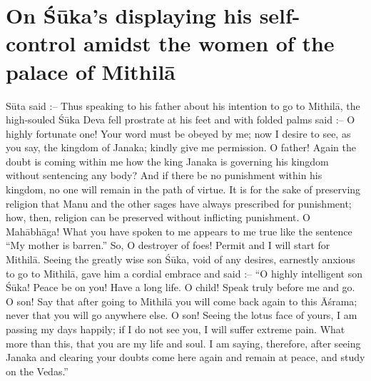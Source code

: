 \chapter{On \'S\=uka's displaying his self-control amidst the women of the palace of Mithil\=a}

S\=uta said :-- Thus speaking to his father about his intention to go to Mithil\=a, the high-souled \'S\=uka Deva fell prostrate at his feet and with folded palms said :-- O highly fortunate one! Your word must be obeyed by me; now I desire to see, as you say, the kingdom of Janaka; kindly give me permission. O father! Again the doubt is coming within me how the king Janaka is governing his kingdom without sentencing any body? And if there be no punishment within his kingdom, no one will remain in the path of virtue. It is for the sake of preserving religion that Manu and the other sages have always prescribed for punishment; how, then, religion can be preserved without inflicting punishment. O Mah\=abh\=aga! What you have spoken to me appears to me true like the sentence ``My mother is barren.'' So, O destroyer of foes! Permit and I will start for Mithil\=a. Seeing the greatly wise son \'S\=uka, void of any desires, earnestly anxious to go to Mithil\=a, gave him a cordial embrace and said :-- ``O highly intelligent son \'S\=uka! Peace be on you! Have a long life. O child! Speak truly before me and go. O son! Say that after going to Mithil\=a you will come back again to this \=A\'srama; never that you will go anywhere else. O son! Seeing the lotus face of yours, I am passing my days happily; if I do not see you, I will suffer extreme pain. What more than this, that you are my life and soul. I am saying, therefore, after seeing Janaka and clearing your doubts come here again and remain at peace, and study on the Vedas.''

